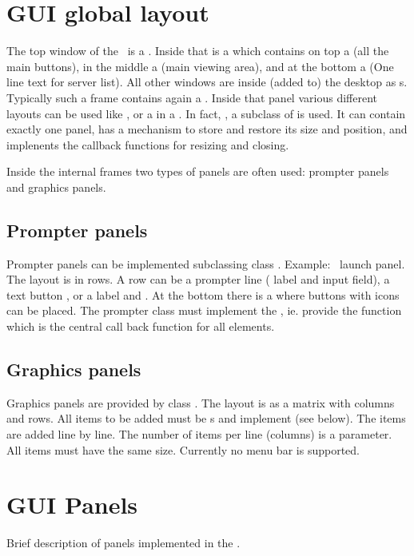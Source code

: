 \section{GUI global layout}
The top window of the \gui\ is a . Inside that is a 
which contains on top a  (all the main buttons), 
in the middle a  (main viewing area), and at the bottom
a  (One line text for server list). 
All other windows are inside (added to) the desktop as s.
Typically such a frame contains again a . Inside that panel various
different layouts can be used like , or a  in a .
In fact, , a subclass of  is used.
It can contain exactly one panel, has a mechanism to store and restore its size and position,
and implenents the callback functions for resizing and closing.

Inside the internal frames two types of panels are often used: prompter panels and
graphics panels.
\subsection{Prompter panels}
Prompter panels can be implemented subclassing class .
Example: \dabc\ launch panel.
The layout is in rows. A row can be a prompter line ( label and  input field),
a text button , or a  label and . At the bottom there is a 
where buttons with icons can be placed. The prompter class must implement the 
, ie. provide the  function which is
the central call back function for all elements.
\subsection{Graphics panels}
Graphics panels are provided by class .
The layout is as a matrix with columns and rows. All items to be added 
must be s and implement  (see below).
The items are added line by line. The number of items per line (columns)
is a parameter. All items must have the same size.
Currently no menu bar is supported.
\section{GUI Panels}
Brief description of panels implemented in the \gui.
